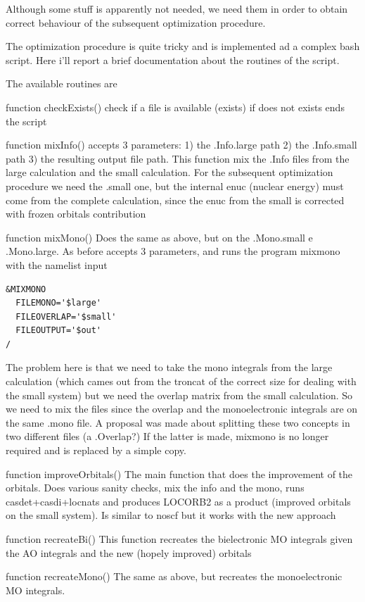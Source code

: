 \documentclass[a4paper,11pt]{report}
\begin{document}
Although some stuff is apparently not needed, we need them in order to
obtain correct behaviour of the subsequent optimization procedure.

The optimization procedure is quite tricky and is implemented ad a complex 
bash script. Here i'll report a brief documentation about the routines of
the script.

The available routines are

function checkExists()
  check if a file is available (exists) if does not exists ends the script

function mixInfo()
  accepts 3 parameters: 1) the .Info.large path 2) the .Info.small path 3)
  the resulting output file path.
  This function mix the .Info files from the large calculation and the small
  calculation. For the subsequent optimization procedure we need the .small
  one, but the internal enuc (nuclear energy) must come from the complete
  calculation, since the enuc from the small is corrected with frozen
  orbitals contribution

function mixMono()
  Does the same as above, but on the .Mono.small e .Mono.large. As before
  accepts 3 parameters, and runs the program mixmono with the namelist input
\begin{verbatim}
&MIXMONO
  FILEMONO='$large'
  FILEOVERLAP='$small'
  FILEOUTPUT='$out'
/
\end{verbatim}
  The problem here is that we need to take the mono integrals from the large
  calculation (which cames out from the troncat of the correct size for
  dealing with the small system) but we need the overlap matrix from the
  small calculation. So we need to mix the files since the overlap and the
  monoelectronic integrals are on the same .mono file. A proposal was made
  about splitting these two concepts in two different files (a .Overlap?)
  If the latter is made, mixmono is no longer required and is replaced by a
  simple copy.

function improveOrbitals()
  The main function that does the improvement of the orbitals. Does various
  sanity checks, mix the info and the mono, runs casdet+casdi+locnats and
  produces LOCORB2 as a product (improved orbitals on the small system). Is
  similar to noscf but it works with the new approach

function recreateBi()
  This function recreates the bielectronic MO integrals given the AO
  integrals and the new (hopely improved) orbitals

function recreateMono()
  The same as above, but recreates the monoelectronic MO integrals.
\end{document}
